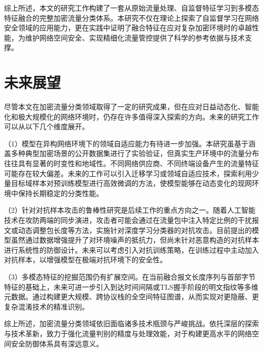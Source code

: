 综上所述，本文的研究工作构建了一套从原始流量处理、自监督特征学习到多模态特征融合的完整加密流量分类体系。本研究不仅在理论上探索了自监督学习在网络安全领域的应用能力，更在实践中证明了融合特征在应对复杂加密环境时的卓越性能，为维护网络空间安全、实现精细化流量管控提供了科学的参考依据与技术支撑。
\section{未来展望}
尽管本文在加密流量分类领域取得了一定的研究成果，但在应对日益动态化、智能化和极大规模化的网络环境时，仍存在许多值得深入探索的方向。未来的研究工作可以从以下几个维度展开。

（1）模型在异构网络环境下的领域自适应能力有待进一步加强。本研究虽基于涵盖多种典型加密场景的公开数据集进行了实验验证，但真实生产环境中的流量分布往往具有显著的时变性和地域性。不同网络供应商、不同终端设备产生的流量特征可能存在较大偏差。未来的工作可以引入迁移学习或领域自适应技术，探索利用少量目标域样本对预训练模型进行高效微调的方法，使模型能够在动态变化的现网环境中保持长期稳定的分类性能。

（2）针对对抗样本攻击的鲁棒性研究是后续工作的重点方向之一。随着人工智能技术在攻防两端的同步演进，攻击者可能会通过在流量包中注入特定比例的干扰报文或动态调整包长度等方法，实施针对深度学习分类器的对抗攻击。目前提出的模型虽然通过数据增强提升了对环境噪声的抵抗力，但尚未针对恶意构造的对抗样本进行系统性的防御设计。未来可以考虑引入对抗训练策略，在训练过程中主动加入对抗样本，以增强模型在极端对抗环境下的安全性。

（3）多模态特征的挖掘范围仍有扩展空间。在当前融合报文长度序列与首部字节特征的基础上，未来可进一步引入到达时间间隔或TLS握手阶段的明文指纹等多维元数据。通过构建更大规模、跨协议栈的全空间特征图谱，从而实现对更隐蔽、更复杂混淆技术的精准识别。

综上所述，加密流量分类领域依旧面临诸多技术瓶颈与严峻挑战。依托深层的探索与技术革新，致力于强化流量判别的精度与处理效能，对于构建更高水平的网络空间安全防御体系具有深远意义。

